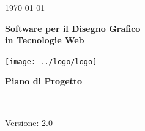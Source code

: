 \usepackage{multirow}
\title{\TITOLODOC}
\author{Dal Bosco Davide}



\renewcommand{\insertversion}{2.0} %
\renewcommand{\TITOLODOC}{Piano di Progetto} %
\renewcommand{\glosspath}{.\glossario} %

\begin{titlepage}
\begin{center}
	\begin{Large}	\today \end{Large}
\end{center}

\vspace{20pt}

\begin{center}
	\begin{Huge}
				\textbf{\ajax}
	\end{Huge}
\end{center}			

\begin{center}
	\begin{large}
				\textbf{Software per il Disegno Grafico\\ in Tecnologie Web}
	\end{large}
\end{center}			

\vspace{20pt}

\begin{center}
\texttt{[image: ../logo/logo]}
\end{center}

\vspace{170pt}
\begin{center} %
	\begin{Huge}
				\textbf{\TITOLODOC}
	\end{Huge}
			\\
\end{center}
\vspace{190pt}
\begin{center}
Versione: \insertversion
\end{center}
\end{titlepage}

\newpage


